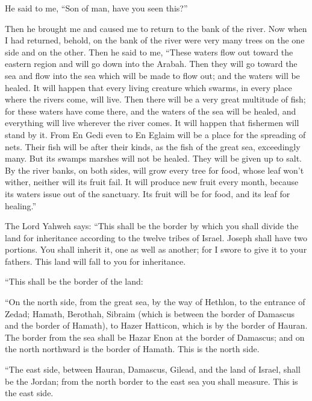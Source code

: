\begin{paracol}{2}
\begin{otherlanguage}{english}
 He said to me, ``Son of man, have you seen this?''

Then he brought me and caused me to return to the bank of the river.
 Now when I had returned, behold, on the bank of the river
were very many trees on the one side and on the other. 
Then he said to me, ``These waters flow out toward the eastern region
and will go down into the Arabah. Then they will go toward the sea and
flow into the sea which will be made to flow out; and the waters will be
healed.  It will happen that every living creature which
swarms, in every place where the rivers come, will live. Then there will
be a very great multitude of fish; for these waters have come there, and
the waters of the sea will be healed, and everything will live wherever
the river comes.  It will happen that fishermen will
stand by it. From En Gedi even to En Eglaim will be a place for the
spreading of nets. Their fish will be after their kinds, as the fish of
the great sea, exceedingly many.  But its swamps marshes
will not be healed. They will be given up to salt.  By
the river banks, on both sides, will grow every tree for food, whose
leaf won't wither, neither will its fruit fail. It will produce new
fruit every month, because its waters issue out of the sanctuary. Its
fruit will be for food, and its leaf for healing.''

 The Lord Yahweh says: ``This shall be the border by
which you shall divide the land for inheritance according to the twelve
tribes of Israel. Joseph shall have two portions.  You
shall inherit it, one as well as another; for I swore to give it to your
fathers. This land will fall to you for inheritance.

 ``This shall be the border of the land:

``On the north side, from the great sea, by the way of Hethlon, to the
entrance of Zedad;  Hamath, Berothah, Sibraim (which is
between the border of Damascus and the border of Hamath), to Hazer
Hatticon, which is by the border of Hauran.  The border
from the sea shall be Hazar Enon at the border of Damascus; and on the
north northward is the border of Hamath. This is the north side.

 ``The east side, between Hauran, Damascus, Gilead, and
the land of Israel, shall be the Jordan; from the north border to the
east sea you shall measure. This is the east side.


\end{otherlanguage}
\end{paracol}
